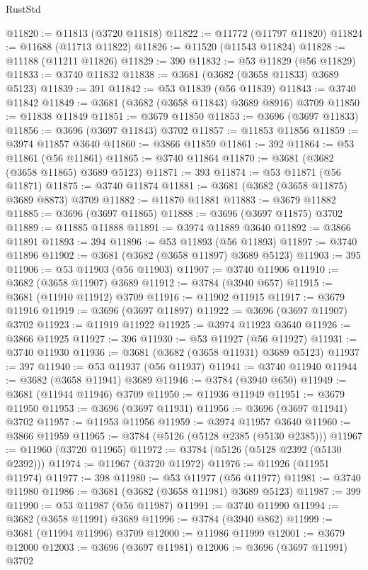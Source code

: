 \begin{lexlean}{RustStd}
\begin{coremodule}
@11820 := @11813 (@3720 @11818)
@11822 := @11772 (@11797 @11820)
@11824 := @11688 (@11713 @11822)
@11826 := @11520 (@11543 @11824)
@11828 := @11188 (@11211 @11826)
@11829 := 390
@11832 := @53 @11829 (@56 @11829)
@11833 := @3740 @11832
@11838 := @3681 (@3682 (@3658 @11833) @3689 @5123)
@11839 := 391
@11842 := @53 @11839 (@56 @11839)
@11843 := @3740 @11842
@11849 := @3681 (@3682 (@3658 @11843) @3689 @8916) @3709
@11850 := @11838 @11849
@11851 := @3679 @11850
@11853 := @3696 (@3697 @11833)
@11856 := @3696 (@3697 @11843) @3702
@11857 := @11853 @11856
@11859 := @3974 @11857 @3640
@11860 := @3866 @11859
@11861 := 392
@11864 := @53 @11861 (@56 @11861)
@11865 := @3740 @11864
@11870 := @3681 (@3682 (@3658 @11865) @3689 @5123)
@11871 := 393
@11874 := @53 @11871 (@56 @11871)
@11875 := @3740 @11874
@11881 := @3681 (@3682 (@3658 @11875) @3689 @8873) @3709
@11882 := @11870 @11881
@11883 := @3679 @11882
@11885 := @3696 (@3697 @11865)
@11888 := @3696 (@3697 @11875) @3702
@11889 := @11885 @11888
@11891 := @3974 @11889 @3640
@11892 := @3866 @11891
@11893 := 394
@11896 := @53 @11893 (@56 @11893)
@11897 := @3740 @11896
@11902 := @3681 (@3682 (@3658 @11897) @3689 @5123)
@11903 := 395
@11906 := @53 @11903 (@56 @11903)
@11907 := @3740 @11906
@11910 := @3682 (@3658 @11907) @3689
@11912 := @3784 (@3940 @657)
@11915 := @3681 (@11910 @11912) @3709
@11916 := @11902 @11915
@11917 := @3679 @11916
@11919 := @3696 (@3697 @11897)
@11922 := @3696 (@3697 @11907) @3702
@11923 := @11919 @11922
@11925 := @3974 @11923 @3640
@11926 := @3866 @11925
@11927 := 396
@11930 := @53 @11927 (@56 @11927)
@11931 := @3740 @11930
@11936 := @3681 (@3682 (@3658 @11931) @3689 @5123)
@11937 := 397
@11940 := @53 @11937 (@56 @11937)
@11941 := @3740 @11940
@11944 := @3682 (@3658 @11941) @3689
@11946 := @3784 (@3940 @650)
@11949 := @3681 (@11944 @11946) @3709
@11950 := @11936 @11949
@11951 := @3679 @11950
@11953 := @3696 (@3697 @11931)
@11956 := @3696 (@3697 @11941) @3702
@11957 := @11953 @11956
@11959 := @3974 @11957 @3640
@11960 := @3866 @11959
@11965 := @3784 (@5126 (@5128 @2385 (@5130 @2385)))
@11967 := @11960 (@3720 @11965)
@11972 := @3784 (@5126 (@5128 @2392 (@5130 @2392)))
@11974 := @11967 (@3720 @11972)
@11976 := @11926 (@11951 @11974)
@11977 := 398
@11980 := @53 @11977 (@56 @11977)
@11981 := @3740 @11980
@11986 := @3681 (@3682 (@3658 @11981) @3689 @5123)
@11987 := 399
@11990 := @53 @11987 (@56 @11987)
@11991 := @3740 @11990
@11994 := @3682 (@3658 @11991) @3689
@11996 := @3784 (@3940 @862)
@11999 := @3681 (@11994 @11996) @3709
@12000 := @11986 @11999
@12001 := @3679 @12000
@12003 := @3696 (@3697 @11981)
@12006 := @3696 (@3697 @11991) @3702

\end{coremodule}
\end{lexlean}
